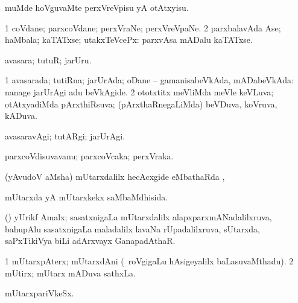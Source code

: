 \noindent
\gl{\pagu}
\expl{}
\bmng
{} muMde hoVguvaMte perxVreVpisu yA otAtxyisu. 
\emng
\eentry

\bentry
{} 
\gl{\nA}
\expl{}
\bmng
\bnum
\num{1} coVdane; parxcoVdane; perxVraNe; perxVreVpaNe. 
\num{2} parxbalavAda Ase; haMbala; kaTATxse; utakxTeVcePx:  parxvAsa mADalu kaTATxse. 
\enum
\emng
\eentry

\bentry
{} 
\gl{\nA}
\expl{}
\bmng
avasara; tutuR; jarUru. 
\emng
\eentry

\bentry
{} 
\gl{\gu}
\bmng
\bnum
\num{1} avasarada; tutiRna; jarUrAda; oDane -- gamanisabeVkAda, mADabeVkAda:  nanage jarUrAgi adu beVkAgide. 
\num{2} ototxtitx meVliMda meVle keVLuva; otAtxyadiMda pArxthiRsuva; (pArxthaRnegaLiMda) beVDuva, koVruva, kADuva. 
\enum
\emng
\eentry

\bentry
{} 
\gl{\kirxvi}
\expl{}
\bmng
avasaravAgi; tutARgi; jarUrAgi. 
\emng
\eentry

\bentry
{} 
\gl{\nA}
\expl{}
\bmng
parxcoVdisuvavanu; parxcoVcaka; perxVraka. 
\emng
\eentry

\bentry
{}
\gl{\saMkiSx}
\expl{}
\bmng
{} 
\emng
\eentry

\bentry
{}
\gl{\saupa}
\expl{}
\bmng
(yAvudoV aMsha) mUtarxdalilx hecAcxgide eMbathaRda \upa, \udA\  
\emng
\eentry

\bentry
{} 
\gl{\gu}
\expl{}
\bmng
mUtarxda yA mUtarxkekx saMbaMdhisida. 
\emng
\eentry

\bentry
{}
\gl{\nA}
\expl{}
\bmng
(\jiVra) yUrikf Amalx; sasatxnigaLa mUtarxdalilx alapxparxmANadalilxruva, bahupAlu sasatxnigaLa maladalilx lavaNa rUpadalilxruva,  sUtarxda, saPxTikiVya biLi adArxvayx GanapadAthaR. 
\emng
\eentry

\bentry
{} 
\gl{\nA}
\expl{}
\bmng
\bnum
\num{1} mUtarxpAterx; mUtarxdAni (\sA\ roVgigaLu hAsigeyalilx baLasuvaMthadu). 
\num{2} mUtirx; mUtarx mADuva sathxLa. 
\enum
\emng
\eentry

\bentry
{} 
\gl{\nA}
\bmng
mUtarxpariVkeSx. 
\emng
\eentry

